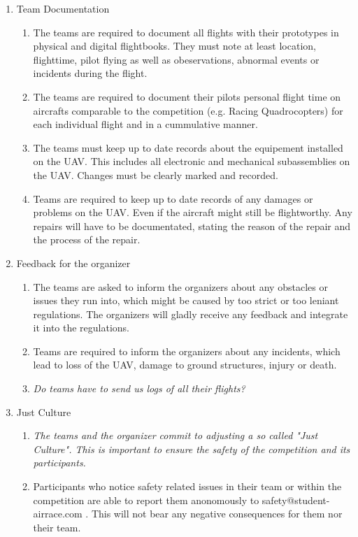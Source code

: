 \begin{enumerate}
    \item{Team Documentation}
    \begin{enumerate}
      \item The teams are required to document all flights with their prototypes in physical and digital flightbooks. They must note at least location, flighttime, pilot flying 
      as well as obeservations, abnormal events or incidents during the flight.
      \item The teams are required to document their pilots personal flight time on aircrafts comparable to the competition (e.g. Racing Quadrocopters)
      for each individual flight and in a cummulative manner. 
      \item The teams must keep up to date records about the equipement installed on the UAV. This includes all electronic and mechanical subassemblies on the UAV. 
      Changes must be clearly marked and recorded. 
      \item Teams are required to keep up to date records of any damages or problems on the UAV. Even if the aircraft might still be flightworthy. 
      Any repairs will have to be documentated, stating the reason of the repair and the process of the repair. 
    \end{enumerate}

    \item{Feedback for the organizer}
    \begin{enumerate}
      \item The teams are asked to inform the organizers about any obstacles or issues they run into, which might be caused by
      too strict or too leniant regulations. The organizers will gladly receive any feedback and integrate it into the regulations. 
      \item Teams are required to inform the organizers about any incidents, which lead to loss of the UAV, damage to ground structures, injury or death. 
      \item \emph{Do teams have to send us logs of all their flights?}
    \end{enumerate}

    \item{Just Culture}
    \begin{enumerate}
      \item \emph{The teams and the organizer commit to adjusting a so called "Just Culture". This is important to ensure the safety of the competition and its participants.}
      \item Participants who notice safety related issues in their team or within the competition are able to report them anonomously to safety@student-airrace.com . This will not bear any
      negative consequences for them nor their team. 
    \end{enumerate}


\end{enumerate}
